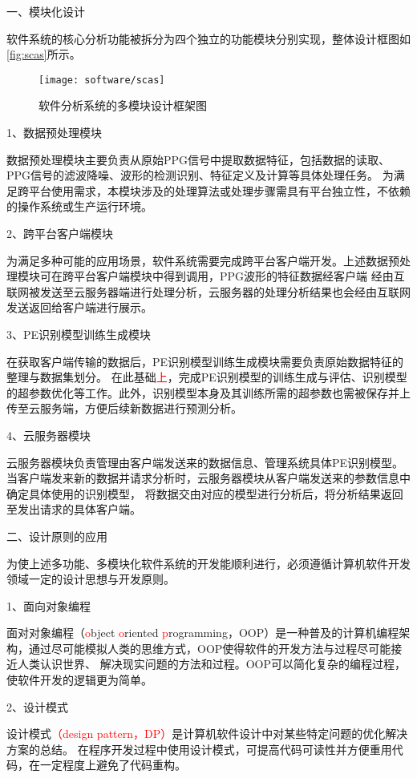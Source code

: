 一、模块化设计

软件系统的核心分析功能被拆分为四个独立的功能模块分别实现，整体设计框图如\autoref{fig:scas}所示。
\begin{figure}[htbp]
    \centering
    \texttt{[image: software/scas]}
    \caption{\label{fig:scas}软件分析系统的多模块设计框架图}
\end{figure}

1、数据预处理模块

数据预处理模块主要负责从原始PPG信号中提取数据特征，包括数据的读取、PPG信号的滤波降噪、波形的检测识别、特征定义及计算等具体处理任务。
为满足跨平台使用需求，本模块涉及的处理算法或处理步骤需具有平台独立性，不依赖的操作系统或生产运行环境。

2、跨平台客户端模块

为满足多种可能的应用场景，软件系统需要完成跨平台客户端开发。上述数据预处理模块可在跨平台客户端模块中得到调用，PPG波形的特征数据经客户端
经由互联网被发送至云服务器端进行处理分析，云服务器的处理分析结果也会经由互联网发送返回给客户端进行展示。

3、PE识别模型训练生成模块

在获取客户端传输的数据后，PE识别模型训练生成模块需要负责原始数据特征的整理与数据集划分。
在此基础\textcolor{red}{上}，完成PE识别模型的训练生成与评估、识别模型的超参数优化等工作。此外，识别模型本身及其训练所需的超参数也需被保存并上传至云服务端，方便后续新数据进行预测分析。

4、云服务器模块

云服务器模块负责管理由客户端发送来的数据信息、管理系统具体PE识别模型。当客户端发来新的数据并请求分析时，云服务器模块从客户端发送来的参数信息中确定具体使用的识别模型，
将数据交由对应的模型进行分析后，将分析结果返回至发出请求的具体客户端。

二、设计原则的应用

为使上述多功能、多模块化软件系统的开发能顺利进行，必须遵循计算机软件开发领域一定的设计思想与开发原则。

1、面向对象编程

面对对象编程（\textcolor{red}{o}bject \textcolor{red}{o}riented \textcolor{red}{p}rogramming，OOP）是一种普及的计算机编程架构，通过尽可能模拟人类的思维方式，OOP使得软件的开发方法与过程尽可能接近人类认识世界、
解决现实问题的方法和过程。OOP可以简化复杂的编程过程，使软件开发的逻辑更为简单。

2、设计模式

设计模式\textcolor{red}{（design pattern，DP）}是计算机软件设计中对某些特定问题的优化解决方案的总结\cite{Gamma1993,Enrich2018}。
在程序开发过程中使用设计模式，可提高代码可读性并方便重用代码，在一定程度上避免了代码重构。

